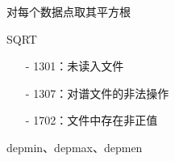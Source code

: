 \label{cmd:sqrt}

对每个数据点取其平方根

\begin{SACSTX}
SQRT
\end{SACSTX}

\begin{itemize}
\item[-]1301：未读入文件
\item[-]1307：对谱文件的非法操作
\item[-]1702：文件中存在非正值
\end{itemize}

depmin、depmax、depmen
